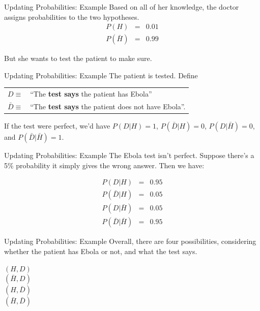 \begin{frame}[t]{Updating Probabilities: Example}
Based on all of her knowledge, the doctor assigns probabilities to the two
hypotheses.
\begin{eqnarray*}
P(H) &=& 0.01\\
P(\bar{H}) &=& 0.99
\end{eqnarray*}

But she wants to test the patient to make sure.
\end{frame}



\begin{frame}[t]{Updating Probabilities: Example}
The patient is tested. Define

\begin{center}
\begin{tabular}{ll}
$D \equiv $ & ``The {\bf test says} the patient has Ebola''\\
$\bar{D} \equiv $ & ``The {\bf test says} the patient does not have Ebola''.
\end{tabular}
\end{center}

If the test were perfect, we'd have $P(D | H) = 1$, $P(\bar{D} | H) = 0$,
$P(D | \bar{H}) = 0$, and $P(\bar{D} | \bar{H}) = 1$.
\end{frame}


\begin{frame}[t]{Updating Probabilities: Example}
The Ebola test isn't perfect. Suppose there's a 5\% probability it simply gives
the wrong answer. Then we have:

\begin{eqnarray*}
P(D | H)   &=& 0.95\\
P(\bar{D} | H) &=& 0.05\\
P(D | \bar{H})   &=& 0.05\\
P(\bar{D} | \bar{H}) &=& 0.95
\end{eqnarray*}

\end{frame}

\begin{frame}[t]{Updating Probabilities: Example}
Overall, there are four possibilities, considering whether the patient has
Ebola or not, and what the test says.

\begin{center}
$(H, D)$\\
$(\bar{H}, D)$\\
$(H, \bar{D})$\\
$(\bar{H}, \bar{D})$
\end{center}


\end{frame}

